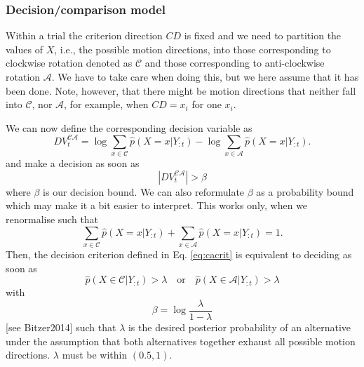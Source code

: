 \documentclass[10pt,a4paper]{article}
\begin{document}
\subsubsection{Decision/comparison model}
Within a trial the criterion direction $CD$ is fixed and we need to partition the values of $X$, i.e., the possible motion directions, into those corresponding to clockwise rotation denoted as $\mathcal{C}$ and those corresponding to anti-clockwise rotation $\mathcal{A}$. We have to take care when doing this, but we here assume that it has been done. Note, however, that there might be motion directions that neither fall into $\mathcal{C}$, nor $\mathcal{A}$, for example, when $CD = x_i$ for one $x_i$.

We can now define the corresponding decision variable as
\begin{equation}
DV_t^{\mathcal{CA}} = \log \sum_{x \in \mathcal{C}} \hat{p}(X=x | Y_{:t}) - \log \sum_{x \in \mathcal{A}} \hat{p}(X=x | Y_{:t}).
\end{equation}
and make a decision as soon as 
\begin{equation}\label{eq:cacrit}
\left|DV_t^{\mathcal{CA}}\right| > \beta
\end{equation}
where $\beta$ is our decision bound. We can also reformulate $\beta$ as a probability bound which may make it a bit easier to interpret. This works only, when we renormalise such that
\begin{equation}
\sum_{x \in \mathcal{C}} \hat{p}(X=x | Y_{:t}) + \sum_{x \in \mathcal{A}} \hat{p}(X=x | Y_{:t}) = 1.
\end{equation}
Then, the decision criterion defined in Eq. \eqref{eq:cacrit} is equivalent to deciding as soon as
\begin{equation}
\hat{p}(X \in \mathcal{C} | Y_{:t}) > \lambda \quad \mathrm{or} \quad \hat{p}(X \in \mathcal{A} | Y_{:t}) > \lambda
\end{equation}
with
\begin{equation}
\beta = \log\frac{\lambda}{1-\lambda}
\end{equation}
[see Bitzer2014] such that $\lambda$ is the desired posterior probability of an alternative under the assumption that both alternatives together exhaust all possible motion directions. $\lambda$ must be within $(0.5, 1)$.
\end{document}
